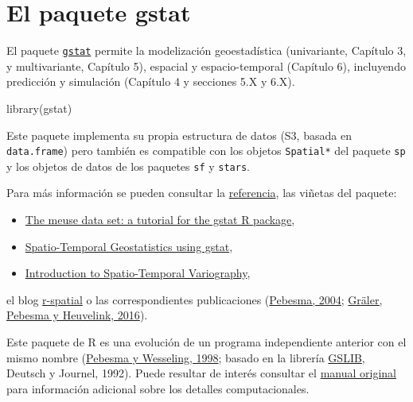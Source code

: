 \documentclass[
  spanish,
]{book}
\newenvironment{Shaded}{\begin{snugshade}}{\end{snugshade}}
\newcommand{\FunctionTok}[1]{\textcolor[rgb]{0.00,0.00,0.00}{#1}}
\newcommand{\NormalTok}[1]{#1}
\providecommand{\tightlist}{%
  \setlength{\itemsep}{0pt}\setlength{\parskip}{0pt}}
\theoremstyle{break}
\begin{document}
\hypertarget{el-paquete-gstat}{%
\section{\texorpdfstring{El paquete \textbf{gstat}}{El paquete gstat}}\label{el-paquete-gstat}}

El paquete \href{https://r-spatial.github.io/gstat}{\texttt{gstat}} permite la modelización geoestadística (univariante, Capítulo 3, y multivariante, Capítulo 5), espacial y espacio-temporal (Capítulo 6), incluyendo predicción y simulación (Capítulo 4 y secciones 5.X y 6.X).

\begin{Shaded}
\begin{Highlighting}[]
\FunctionTok{library}\NormalTok{(gstat)}
\end{Highlighting}
\end{Shaded}

Este paquete implementa su propia estructura de datos (S3, basada en \texttt{data.frame}) pero también es compatible con los objetos \texttt{Spatial*} del paquete \texttt{sp} y los objetos de datos de los paquetes \texttt{sf} y \texttt{stars}.

Para más información se pueden consultar la \href{https://r-spatial.github.io/gstat/reference/index.html}{referencia}, las viñetas del paquete:

\begin{itemize}
\tightlist
\item
  \href{https://cran.r-project.org/web/packages/gstat/vignettes/gstat.pdf}{The meuse data set: a tutorial for the gstat R package},
\item
  \href{https://cran.r-project.org/web/packages/gstat/vignettes/spatio-temporal-kriging.pdf}{Spatio-Temporal Geostatistics using gstat},
\item
  \href{https://cran.r-project.org/web/packages/gstat/vignettes/st.pdf}{Introduction to Spatio-Temporal Variography},
\end{itemize}

el blog \href{https://r-spatial.org/}{r-spatial} o las correspondientes publicaciones (\href{http://www.sciencedirect.com/science/article/pii/S0098300404000676}{Pebesma, 2004}; \href{https://journal.r-project.org/archive/2016-1/na-pebesma-heuvelink.pdf}{Gräler, Pebesma y Heuvelink, 2016}).

Este paquete de R es una evolución de un programa independiente anterior con el mismo nombre (\href{http://www.sciencedirect.com/science/article/pii/S0098300497000824}{Pebesma y Wesseling, 1998}; basado en la librería \href{http://www.gslib.com}{GSLIB}, Deutsch y Journel, 1992).
Puede resultar de interés consultar el \href{http://www.gstat.org/gstat.pdf}{manual original} para información adicional sobre los detalles computacionales.
\end{document}
